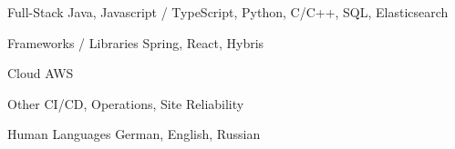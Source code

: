

\begin{cvskills}

  \cvskill
    {Full-Stack} 
    {Java, Javascript / TypeScript, Python, C/C++, SQL, Elasticsearch} 

  \cvskill
    {Frameworks / Libraries}
    {Spring, React, Hybris}

  \cvskill
    {Cloud}
    {AWS}

  \cvskill
    {Other} 
    {CI/CD, Operations, Site Reliability}

  \cvskill
    {Human Languages} 
    {German, English, Russian} 

\end{cvskills}

